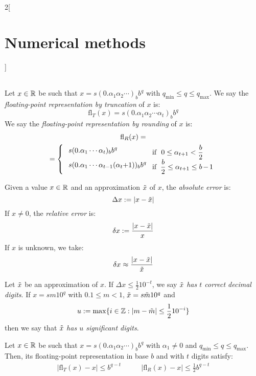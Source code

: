 \documentclass[../../../main.tex]{subfiles}
\begin{document}
\begin{multicols}{2}[\section{Numerical methods}]
\begin{center}
\begin{minipage}{\linewidth}
\begin{tabular}{c|ccccc}
      \end{tabular}
    \end{minipage}
  \end{center}
  \begin{definition}
    Let $x\in\mathbb{R}$ be such that $x=s(0.\alpha_1\alpha_2\cdots)_bb^q$ with $q_\text{min}\leq q\leq q_\text{max}$. We say the \emph{floating-point representation by truncation} of $x$ is: $$\text{fl}_T(x)=s(0.\alpha_1\alpha_2\cdots\alpha_t)_bb^q$$ We say the \emph{floating-point representation by rounding} of $x$ is:
    \begin{multline*}
      \text{fl}_R(x)=\\=\left\{\text{\setlength{\tabcolsep}{4pt}
        \begin{tabular}{m{3.85cm}m{3cm}}
          $s(0.\alpha_1\cdots\alpha_t)_bb^q$                 & if $\ 0\leq\alpha_{t+1}<\frac{b}{2}$       \\
          $s(0.\alpha_1\cdots\alpha_{t-1}(\alpha_t+1))_bb^q$ & if $\ \frac{b}{2}\leq\alpha_{t+1}\leq b-1$
        \end{tabular}}\right.
    \end{multline*}
  \end{definition}
  \begin{definition}
    Given a value $x\in\mathbb{R}$ and an approximation $\Tilde{x}$ of $x$, the \emph{absolute error} is: $$\Delta x:=|x-\Tilde{x}|$$ If $x\ne 0$, the \emph{relative error} is: $$\delta x:=\frac{|x-\Tilde{x}|}{x}$$ If $x$ is unknown, we take: $$\delta x\approx\frac{|x-\Tilde{x}|}{\Tilde{x}}$$
  \end{definition}
  \begin{definition}
    Let $\Tilde{x}$ be an approximation of $x$. If $\Delta x\leq\frac{1}{2}10^{-t}$, we say $\Tilde{x}$ \emph{has $t$ correct decimal digits}. If $x=sm10^q$ with $0.1\leq m<1$, $\Tilde{x}=s\Tilde{m}10^q$ and $$u:=\max\{i\in\mathbb{Z}:|m-\Tilde{m}|\leq\frac{1}{2}10^{-i}\}$$ then we say that $\Tilde{x}$ \emph{has $u$ significant digits}.
  \end{definition}
  \begin{proposition}
    Let $x\in\mathbb{R}$ be such that $x=s(0.\alpha_1\alpha_2\cdots)_bb^q$ with $\alpha_1\ne0$ and $q_\text{min}\leq q\leq q_\text{max}$. Then, its floating-point representation in base $b$ and with $t$ digits satisfy:
    \begin{align*}
      \left|\text{fl}_T(x)-x\right|\leq b^{q-t}\quad           & \quad \left|\text{fl}_R(x)-x\right|\leq\frac{1}{2}b^{q-t}           \\

\end{align*}
\end{proposition}
\end{multicols}
\end{document}
